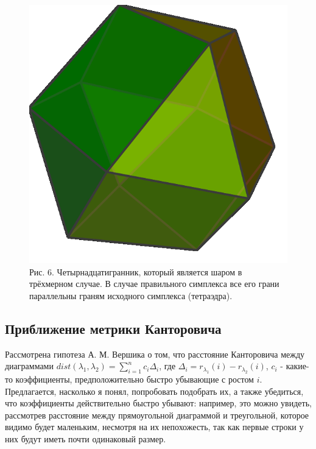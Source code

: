 \documentclass[12pt]{report}
\begin{document}
\begin{figure}[!ht]
\begin{center}
\includegraphics[scale=0.4]{14surf}
\\Рис. 6. Четырнадцатигранник, который является шаром в трёхмерном случае. В случае правильного симплекса все его грани параллельны граням исходного симплекса (тетраэдра).
\end{center}
\end{figure}

\newpage
\subsection*{Приближение метрики Канторовича}
\hspace{\parindent} Рассмотрена гипотеза А. М. Вершика о том, что расстояние Канторовича между диаграммами $dist(\lambda_1, \lambda_2) = \sum\limits_{i = 1}^n c_i\Delta_i$, где $\Delta_i = r_{\lambda_1}(i) - r_{\lambda_2}(i)$, $c_i$ - какие-то коэффициенты, предположительно быстро убывающие с ростом $i$. Предлагается, насколько я понял, попробовать подобрать их, а также убедиться, что коэффициенты действительно быстро убывают:  например, это можно увидеть, рассмотрев расстояние между прямоугольной диаграммой и треугольной, которое видимо будет маленьким, несмотря на их непохожесть, так как первые строки у них будут иметь почти одинаковый размер. 
\end{document}
